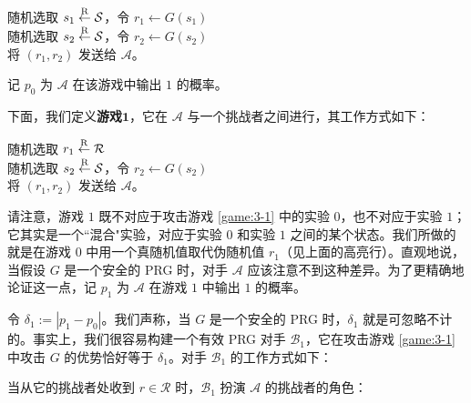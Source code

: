 \vspace*{10pt}

\hspace*{5pt} 随机选取 $s_1\overset{\rm R}\leftarrow\mathcal S$，令 $r_1\leftarrow G(s_1)$\\
\hspace*{26pt} 随机选取 $s_2\overset{\rm R}\leftarrow\mathcal S$，令 $r_2\leftarrow G(s_2)$\\
\hspace*{26pt} 将 $(r_1,r_2)$ 发送给 $\mathcal A$。

\vspace*{10pt}

\noindent
记 $p_0$ 为 $\mathcal A$ 在该游戏中输出 $1$ 的概率。

下面，我们定义\textbf{游戏$\mathbf{1}$}，它在 $\mathcal A$ 与一个挑战者之间进行，其工作方式如下：

\vspace*{10pt}

\hspace*{2pt} \colorbox{gray!50}{随机选取 $r_1\overset{\rm R}\leftarrow\mathcal R$}\\
\hspace*{26pt} 随机选取 $s_2\overset{\rm R}\leftarrow\mathcal S$，令 $r_2\leftarrow G(s_2)$\\
\hspace*{26pt} 将 $(r_1,r_2)$ 发送给 $\mathcal A$。

\vspace*{10pt}

\noindent
请注意，游戏 $1$ 既不对应于攻击游戏 \ref{game:3-1} 中的实验 $0$，也不对应于实验 $1$；它其实是一个``混合"实验，对应于实验 $0$ 和实验 $1$ 之间的某个状态。我们所做的就是在游戏 $0$ 中用一个真随机值取代伪随机值 $r_1$（见上面的高亮行）。直观地说，当假设 $G$ 是一个安全的 PRG 时，对手 $\mathcal A$ 应该注意不到这种差异。为了更精确地论证这一点，记 $p_1$ 为 $\mathcal A$ 在游戏 $1$ 中输出 $1$ 的概率。

令 $\delta_1:=|p_1-p_0|$。我们声称，当 $G$ 是一个安全的 PRG 时，$\delta_1$ 就是可忽略不计的。事实上，我们很容易构建一个有效 PRG 对手 $\mathcal B_1$，它在攻击游戏 \ref{game:3-1} 中攻击 $G$ 的优势恰好等于 $\delta_1$。对手 $\mathcal B_1$ 的工作方式如下：

\vspace*{10pt}

\hspace*{5pt} 当从它的挑战者处收到 $r\in\mathcal R$ 时，$\mathcal B_1$ 扮演 $\mathcal A$ 的挑战者的角色：

